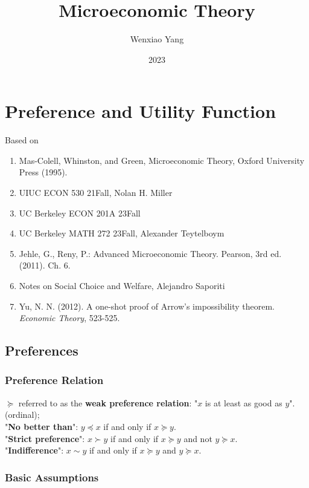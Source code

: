 \documentclass[11pt]{elegantbook}
\title{\textbf{Microeconomic Theory}}
\author{Wenxiao Yang}
\institute{Haas School of Business, University of California Berkeley}
\date{2023}
\begin{document}
\maketitle
\frontmatter
\tableofcontents
\mainmatter



\chapter{Preference and Utility Function}
Based on
\begin{enumerate}[$\circ$]
    \item Mas-Colell, Whinston, and Green, Microeconomic Theory, Oxford University Press (1995).
    \item UIUC ECON 530 21Fall, Nolan H. Miller
    \item UC Berkeley ECON 201A 23Fall
    \item UC Berkeley MATH 272 23Fall, Alexander Teytelboym
    \item  Jehle, G., Reny, P.: Advanced Microeconomic Theory. Pearson, 3rd ed. (2011). Ch. 6.
    \item Notes on Social Choice and Welfare, Alejandro Saporiti
    \item Yu, N. N. (2012). A one-shot proof of Arrow's impossibility theorem. \textit{Economic Theory}, 523-525.
\end{enumerate}


\section{Preferences}

\subsection{Preference Relation}
\begin{definition}
    \normalfont
    $\succeq$ referred to as the \textbf{weak preference relation}: "$x$ is at least as good as $y$". (ordinal);\\
    "\textbf{No better than}": $y \preceq x$ if and only if $x \succeq y$.\\
    "\textbf{Strict preference}": $x \succ y$ if and only if $x \succeq y$ and not $y \succeq x$.\\
    "\textbf{Indifference}": $x \sim y$ if and only if $x \succeq y$ and $y \succeq x$.
\end{definition}


\subsection{Basic Assumptions}
\end{document}
